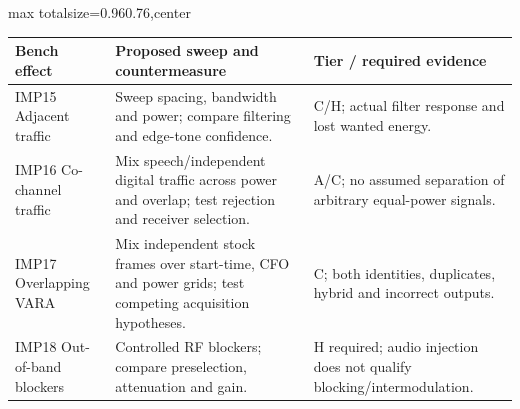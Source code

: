 \documentclass[11pt,a4paper]{article}
\newlength{\tableavail}
\renewcommand{\arraystretch}{1.13}
\begin{document}
\begin{landscape}\thispagestyle{plain}\centering
\setlength{\tabcolsep}{5pt}\renewcommand{\arraystretch}{1.25}
\setlength{\tableavail}{\dimexpr\linewidth-4\tabcolsep\relax}
\begin{adjustbox}{max totalsize={0.96\linewidth}{0.76\textheight},center}
\begin{tabular}{@{}>{\raggedright\arraybackslash}p{0.23\tableavail}>{\raggedright\arraybackslash}p{0.54\tableavail}>{\raggedright\arraybackslash}p{0.23\tableavail}@{}}
\toprule
\textbf{Bench effect} & \textbf{Proposed sweep and countermeasure} & \textbf{Tier / required evidence}\\
\midrule
IMP15 Adjacent traffic & Sweep spacing, bandwidth and power; compare filtering and edge-tone confidence. & C/H; actual filter response and lost wanted energy.\\[5pt]
IMP16 Co-channel traffic & Mix speech/independent digital traffic across power and overlap; test rejection and receiver selection. & A/C; no assumed separation of arbitrary equal-power signals.\\[5pt]
IMP17 Overlapping VARA & Mix independent stock frames over start-time, CFO and power grids; test competing acquisition hypotheses. & C; both identities, duplicates, hybrid and incorrect outputs.\\[5pt]
IMP18 Out-of-band blockers & Controlled RF blockers; compare preselection, attenuation and gain. & H required; audio injection does not qualify blocking/intermodulation.\\[5pt]
\bottomrule
\end{tabular}
\end{adjustbox}
\end{landscape}
\end{document}
